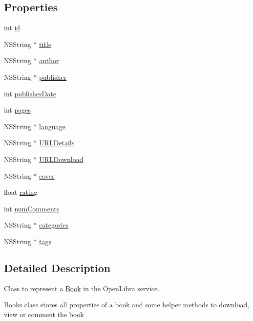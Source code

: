 \subsection*{Properties}
\begin{DoxyCompactItemize}
\item 
int \hyperlink{interface_book_ade1e6376cdb0417bd207733607f6669a}{id}
\item 
NSString $\ast$ \hyperlink{interface_book_a507a4a5b02d5d042f6716316e2e5e293}{title}
\item 
NSString $\ast$ \hyperlink{interface_book_a9612be5178b7b2d676b32e77a436580a}{author}
\item 
NSString $\ast$ \hyperlink{interface_book_ab50b743487d36dbad67e0c27c2db6d95}{publisher}
\item 
int \hyperlink{interface_book_a96ce18e68a2e534ef4d68b2c426d6440}{publisherDate}
\item 
int \hyperlink{interface_book_afce3f5159731bc21f6d4eca13f957c98}{pages}
\item 
NSString $\ast$ \hyperlink{interface_book_a410185f5b9cba8002f29c7b90efc63fd}{language}
\item 
NSString $\ast$ \hyperlink{interface_book_ae922c5937572505b3675a24bacf61c53}{URLDetails}
\item 
NSString $\ast$ \hyperlink{interface_book_ac0535b8b5a6b54eacbdb3e36338210e7}{URLDownload}
\item 
NSString $\ast$ \hyperlink{interface_book_ab9a2eba00a1c12702737db9f315cb1e8}{cover}
\item 
float \hyperlink{interface_book_a8afeec1f31606be6859a1db6d85c2692}{rating}
\item 
int \hyperlink{interface_book_a30fb1d5f55bbff0bb59069d8edac6fc5}{numComments}
\item 
NSString $\ast$ \hyperlink{interface_book_a5d02b41a17f0bf3da50e4613762d3865}{categories}
\item 
NSString $\ast$ \hyperlink{interface_book_a7a8f43ac597fb2a8280a4323157844d3}{tags}
\end{DoxyCompactItemize}


\subsection{Detailed Description}
Class to represent a \hyperlink{interface_book}{Book} in the OpenLibra service.

Books class stores all properties of a book and some helper methods to download, view or comment the book 

